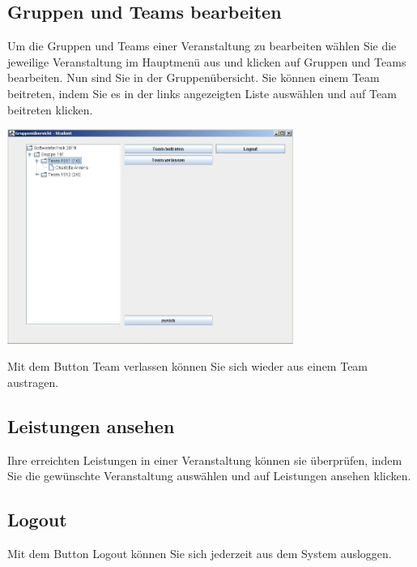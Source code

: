 \documentclass{Handbuch}
\begin{document}
\subsection{Gruppen und Teams bearbeiten}\label{sec:gruppenteamsbearbeiten}
Um die Gruppen und Teams einer Veranstaltung zu bearbeiten wählen Sie die jeweilige Veranstaltung im Hauptmenü aus und klicken auf \frqq Gruppen und Teams bearbeiten\flqq{}.
Nun sind Sie in der Gruppenübersicht. Sie können einem Team beitreten, indem Sie es in der links angezeigten Liste auswählen und auf \frqq Team beitreten\flqq{} klicken. 
\begin{center}
	\includegraphics[width=0.7\textwidth]{img_student3.jpg}
\end{center}
Mit dem Button \frqq Team verlassen\flqq{} können Sie sich wieder aus einem Team austragen.

\subsection{Leistungen ansehen}
\begin{center}
\end{center}
Ihre erreichten Leistungen in einer Veranstaltung können sie überprüfen, indem Sie die gewünschte Veranstaltung auswählen und auf \frqq Leistungen ansehen\flqq{} klicken.


\subsection{Logout}
Mit dem Button \frqq Logout\flqq{} können Sie sich jederzeit aus dem System ausloggen.
\end{document}
